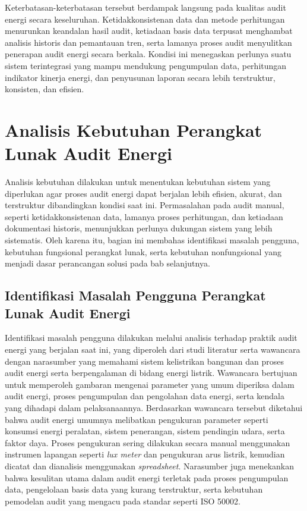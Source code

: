 Keterbatasan-keterbatasan tersebut berdampak langsung pada kualitas audit energi secara keseluruhan. Ketidakkonsistenan data dan metode perhitungan menurunkan keandalan hasil audit, ketiadaan basis data terpusat menghambat analisis historis dan pemantauan tren, serta lamanya proses audit menyulitkan penerapan audit energi secara berkala. Kondisi ini menegaskan perlunya suatu sistem terintegrasi yang mampu mendukung pengumpulan data, perhitungan indikator kinerja energi, dan penyusunan laporan secara lebih terstruktur, konsisten, dan efisien.

\section{Analisis Kebutuhan Perangkat Lunak Audit Energi}
Analisis kebutuhan dilakukan untuk menentukan kebutuhan sistem yang diperlukan agar proses audit energi dapat berjalan lebih efisien, akurat, dan terstruktur dibandingkan kondisi saat ini. Permasalahan pada audit manual, seperti ketidakkonsistenan data, lamanya proses perhitungan, dan ketiadaan dokumentasi historis, menunjukkan perlunya dukungan sistem yang lebih sistematis. Oleh karena itu, bagian ini membahas identifikasi masalah pengguna, kebutuhan fungsional perangkat lunak, serta kebutuhan nonfungsional yang menjadi dasar perancangan solusi pada bab selanjutnya.

\subsection{Identifikasi Masalah Pengguna Perangkat Lunak Audit Energi}
Identifikasi masalah pengguna dilakukan melalui analisis terhadap praktik audit energi yang berjalan saat ini, yang diperoleh dari studi literatur serta wawancara dengan narasumber yang memahami sistem kelistrikan bangunan dan proses audit energi serta berpengalaman di bidang energi listrik. Wawancara bertujuan untuk memperoleh gambaran mengenai parameter yang umum diperiksa dalam audit energi, proses pengumpulan dan pengolahan data energi, serta kendala yang dihadapi dalam pelaksanaannya. Berdasarkan wawancara tersebut diketahui bahwa audit energi umumnya melibatkan pengukuran parameter seperti konsumsi energi peralatan, sistem penerangan, sistem pendingin udara, serta faktor daya. Proses pengukuran sering dilakukan secara manual menggunakan instrumen lapangan seperti \textit{lux meter} dan pengukuran arus listrik, kemudian dicatat dan dianalisis menggunakan \textit{spreadsheet}. Narasumber juga menekankan bahwa kesulitan utama dalam audit energi terletak pada proses pengumpulan data, pengelolaan basis data yang kurang terstruktur, serta kebutuhan pemodelan audit yang mengacu pada standar seperti ISO 50002.

